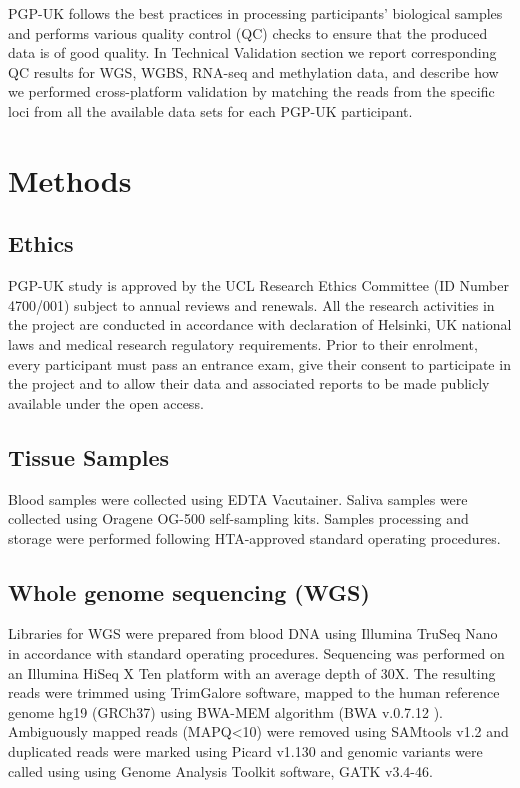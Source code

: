 \documentclass[english]{article}
\begin{document}
PGP-UK follows the best practices in processing participants' biological samples and performs various quality control (QC) checks to ensure that the produced data is of good quality. In Technical Validation section we report corresponding QC results for WGS, WGBS, RNA-seq and methylation data, and describe how we performed cross-platform validation by matching the reads from the specific loci from all the available data sets for each PGP-UK participant.

\section*{Methods}

\subsection*{Ethics}
PGP-UK study is approved by the UCL Research Ethics Committee (ID Number 4700/001) subject to annual reviews and renewals. All the research activities in the project are conducted in accordance with declaration of Helsinki, UK national laws and medical research regulatory requirements. Prior to their enrolment, every participant must pass an entrance exam, give their consent to participate in the project and to allow their data and associated reports to be made publicly available under the open access.

\subsection*{Tissue Samples}
Blood samples were collected using EDTA Vacutainer. Saliva samples were collected using Oragene OG-500 self-sampling kits. Samples processing and storage were performed following HTA-approved standard operating procedures.

\subsection*{Whole genome sequencing (WGS)}
Libraries for WGS were prepared from blood DNA using Illumina TruSeq Nano in accordance with standard operating procedures. Sequencing was performed on an Illumina HiSeq X Ten platform with an average depth of 30X. The resulting reads were trimmed using TrimGalore software, mapped to the human reference genome hg19 (GRCh37) using BWA-MEM algorithm (BWA v.0.7.12 \cite{bwa_mem}). Ambiguously mapped reads (MAPQ<10) were removed using SAMtools v1.2 \cite{samtools} and duplicated reads were marked using Picard v1.130 and genomic variants were called using using Genome Analysis Toolkit software, GATK v3.4-46.
\end{document}
